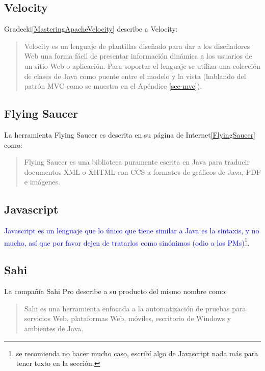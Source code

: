 \subsection{Velocity}\label{sec-velocity}
Gradecki\ref{MasteringApacheVelocity} describe a Velocity:

\begin{quote}
	Velocity es un lenguaje de plantillas diseñado para dar a los diseñadores Web una forma fácil de presentar información dinámica a los usuarios de un sitio Web o aplicación. Para soportar el lenguaje se utiliza una colección de clases de Java como puente entre el modelo y la vista (hablando del patrón MVC como se muestra en el Apéndice \ref{sec-mvc}).
\end{quote}

\subsection{Flying Saucer}\label{sec-flying-saucer}
La herramienta Flying Saucer es descrita en su página de Internet\ref{FlyingSaucer} como:
\begin{quote}
	Flying Saucer es una biblioteca puramente escrita en Java para traducir documentos XML o XHTML con CCS a formatos de gráficos de Java, PDF e imágenes.
\end{quote}


\subsection{Javascript}\label{sec-javascript}
\textcolor{blue}{Javascript es un lenguaje que lo único que tiene similar a Java es la sintaxis, y no mucho, así que por favor dejen de tratarlos como sinónimos (odio a los PMs)}\footnote{se recomienda no hacer mucho caso, escribí algo de Javascript nada más para tener texto en la sección.}.

\subsection{Sahi}\label{sec-sahi}
La compañía Sahi Pro\textsuperscript{\textcopyright}\cite{SahiPro} describe a su producto del mismo nombre como:
\begin{quote}
	Sahi es una herramienta enfocada a la automatización de pruebas para servicios Web, plataformas Web, móviles, escritorio de Windows\textsuperscript{\textcopyright} y ambientes de Java.
\end{quote}

